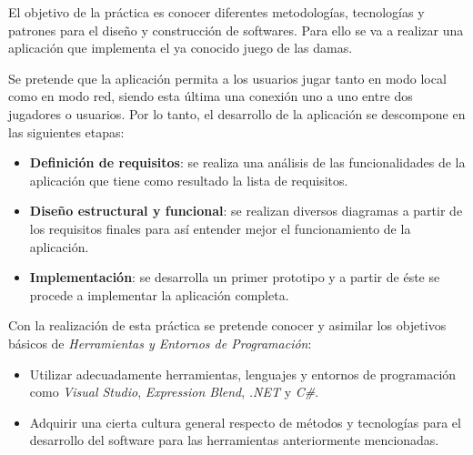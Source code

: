 
El objetivo de la práctica es conocer diferentes metodologías, tecnologías y
patrones para el diseño y construcción de softwares. Para ello se va
a realizar una aplicación que implementa el ya conocido juego de las damas. 

Se pretende que la aplicación permita a los usuarios jugar tanto en modo local 
como en modo red, siendo esta última una conexión uno a uno entre dos jugadores
o usuarios. Por lo tanto, el desarrollo de la aplicación se descompone en las 
siguientes etapas:

\begin{itemize}
\item \textbf{Definición de requisitos}: se realiza una análisis de las 
funcionalidades de la aplicación que tiene como resultado la lista de 
requisitos.
\item \textbf{Diseño estructural y funcional}: se realizan diversos diagramas a
partir de los requisitos finales para así entender mejor el funcionamiento de la
aplicación.
\item \textbf{Implementación}: se desarrolla un primer prototipo y a partir de 
éste se procede a implementar la aplicación completa.
\end{itemize}

Con la realización de esta práctica se pretende conocer y asimilar los 
objetivos básicos de \emph{Herramientas y Entornos de Programación}:

\begin{itemize}
\item Utilizar adecuadamente herramientas, lenguajes y entornos de programación
como \emph{Visual Studio}, \emph{Expression Blend}, \emph{.NET} y \emph{C\#}.
\item Adquirir una cierta cultura general respecto de métodos y tecnologías
para el desarrollo del software para las herramientas anteriormente 
mencionadas.
\end{itemize}
